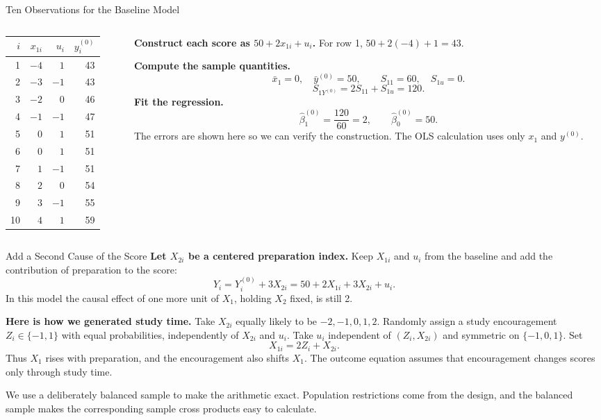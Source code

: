 \documentclass[10pt,aspectratio=169]{beamer}
\begin{document}
\begin{frame}{Ten Observations for the Baseline Model}
\begin{columns}[T,onlytextwidth]
\begin{column}{0.44\textwidth}
\centering
\begin{tabular}{rrrr}
\toprule
$i$ & $x_{1i}$ & $u_i$ & $y_i^{(0)}$\\
\midrule
1 & $-4$ & $1$ & 43\\
2 & $-3$ & $-1$ & 43\\
3 & $-2$ & $0$ & 46\\
4 & $-1$ & $-1$ & 47\\
5 & $0$ & $1$ & 51\\
6 & $0$ & $1$ & 51\\
7 & $1$ & $-1$ & 51\\
8 & $2$ & $0$ & 54\\
9 & $3$ & $-1$ & 55\\
10 & $4$ & $1$ & 59\\
\bottomrule
\end{tabular}
\end{column}
\begin{column}{0.53\textwidth}
\textbf{Construct each score as $50+2x_{1i}+u_i$.}
For row 1, $50+2(-4)+1=43$.
\medskip

\textbf{Compute the sample quantities.}
\[
\bar x_1=0,\quad \bar y^{(0)}=50,
\qquad S_{11}=60,\quad S_{1u}=0.
\]
\[
S_{1Y^{(0)}}=2S_{11}+S_{1u}=120.
\]
\textbf{Fit the regression.}
\[
\hat\beta_1^{(0)}=\frac{120}{60}=2,
\qquad \hat\beta_0^{(0)}=50.
\]
The errors are shown here so we can verify the construction. The OLS calculation uses only $x_1$ and $y^{(0)}$.
\end{column}
\end{columns}
\end{frame}

\begin{frame}{Add a Second Cause of the Score}
\textbf{Let $X_{2i}$ be a centered preparation index.} Keep $X_{1i}$ and $u_i$ from the baseline and add the contribution of preparation to the score:
\[
Y_i=Y_i^{(0)}+3X_{2i}=50+2X_{1i}+3X_{2i}+u_i.
\]
In this model the causal effect of one more unit of $X_1$, holding $X_2$ fixed, is still 2.
\medskip

\textbf{Here is how we generated study time.} Take $X_{2i}$ equally likely to be $-2,-1,0,1,2$. Randomly assign a study encouragement $Z_i\in\{-1,1\}$ with equal probabilities, independently of $X_{2i}$ and $u_i$. Take $u_i$ independent of $(Z_i,X_{2i})$ and symmetric on $\{-1,0,1\}$. Set
\[
\boxed{X_{1i}=2Z_i+X_{2i}.}
\]
Thus $X_1$ rises with preparation, and the encouragement also shifts $X_1$. The outcome equation assumes that encouragement changes scores only through study time.
\medskip

We use a deliberately balanced sample to make the arithmetic exact. Population restrictions come from the design, and the balanced sample makes the corresponding sample cross products easy to calculate.
\end{frame}
\end{document}
